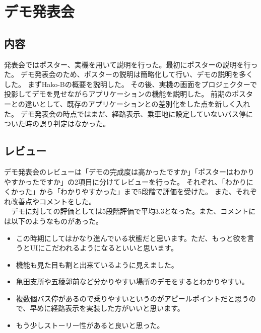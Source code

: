 \documentclass[openany,11pt,papersize]{jsbook}
\begin{document}

\section{デモ発表会}
\subsection{内容}
発表会ではポスター、実機を用いて説明を行った。最初にポスターの説明を行った。
デモ発表会のため、ポスターの説明は簡略化して行い、デモの説明を多くした。
まずHako-Bの概要を説明した。
その後、実機の画面をプロジェクターで投影してデモを見せながらアプリケーションの機能を説明した。
前期のポスターとの違いとして、既存のアプリケーションとの差別化をした点を新しく入れた。
デモ発表会の時点ではまだ、経路表示、乗車地に設定していないバス停についた時の誤り判定はなかった。


\subsection{レビュー}
デモ発表会のレビューは「デモの完成度は高かったですか」「ポスターはわかりやすかったですか」の2項目に分けてレビューを行った。
それぞれ、「わかりにくかった」から「わかりやすかった」まで5段階で評価を受けた。
また、それぞれ改善点やコメントをした。\\
　デモに対しての評価としては5段階評価で平均3.3となった。また、コメントには以下のようなものがあった。
\begin{itemize}

\item この時期にしてはかなり進んでいる状態だと思います。ただ、もっと欲を言うとUIにこだわれるようになるといいと思います。
\item 機能も見た目も割と出来ているように見えました。
\item 亀田支所や五稜郭前など分かりやすい場所のデモをするとわかりやすい。
\item 複数個バス停があるので乗りやすいというのがアピールポイントだと思うので、早めに経路表示を実装した方がいいと思います。
\item もう少しストーリー性があると良いと思った。

\end{itemize}
\end{document}
